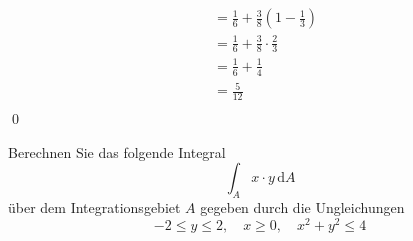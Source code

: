 \documentclass[answers]{exam}
\renewcommand{\d}{\,\mathrm{d}}
\begin{document}
\begin{questions}
\begin{solution}
$$\begin{aligned}
                                           & = \frac{1}{6} + \frac{3}{8} \left( 1-\frac{1}{3} \right)                                                                                                                     \\
                                           & = \frac{1}{6} + \frac{3}{8} \cdot \frac{2}{3}                                                                                                                                \\
                                           & = \frac{1}{6} + \frac{1}{4}                                                                                                                                                  \\
                                           & = \frac{5}{12}                                                                                                                                                               \\
            \end{aligned}
        $$\qed
    \end{solution}

    \newpage
    \question
    Berechnen Sie das folgende Integral
    $$
        \int_A x\cdot y \d A
    $$
    über dem Integrationsgebiet $A$ gegeben durch die Ungleichungen
    $$
        -2 \leq y \leq 2, \quad x \geq 0, \quad x^2 + y^2 \leq 4
    $$
\end{questions}
\end{document}

